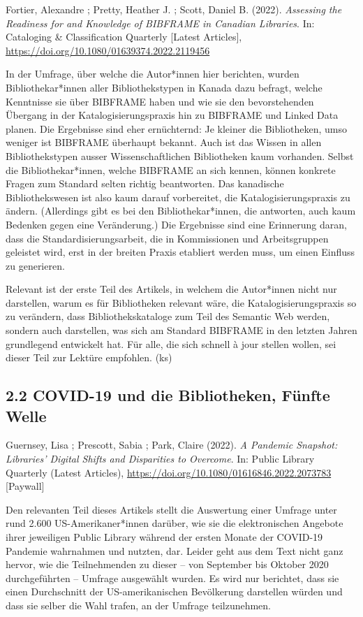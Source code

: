 \documentclass[a4paper,
fontsize=11pt,
oneside,
numbers=noperiodatend,
parskip=half-,
bibliography=totoc,
final
]{scrartcl}
\begin{document}
Fortier, Alexandre ; Pretty, Heather J. ; Scott, Daniel B. (2022).
\emph{Assessing the Readiness for and Knowledge of BIBFRAME in Canadian
Libraries}. In: Cataloging \& Classification Quarterly {[}Latest
Articles{]}, \url{https://doi.org/10.1080/01639374.2022.2119456}

In der Umfrage, über welche die Autor*innen hier berichten, wurden
Bibliothekar*innen aller Bibliothekstypen in Kanada dazu befragt, welche
Kenntnisse sie über BIBFRAME haben und wie sie den bevorstehenden
Übergang in der Katalogisierungspraxis hin zu BIBFRAME und Linked Data
planen. Die Ergebnisse sind eher ernüchternd: Je kleiner die
Bibliotheken, umso weniger ist BIBFRAME überhaupt bekannt. Auch ist das
Wissen in allen Bibliothekstypen ausser Wissenschaftlichen Bibliotheken
kaum vorhanden. Selbst die Bibliothekar*innen, welche BIBFRAME an sich
kennen, können konkrete Fragen zum Standard selten richtig beantworten.
Das kanadische Bibliothekswesen ist also kaum darauf vorbereitet, die
Katalogisierungspraxis zu ändern. (Allerdings gibt es bei den
Bibliothekar*innen, die antworten, auch kaum Bedenken gegen eine
Veränderung.) Die Ergebnisse sind eine Erinnerung daran, dass die
Standardisierungsarbeit, die in Kommissionen und Arbeitsgruppen
geleistet wird, erst in der breiten Praxis etabliert werden muss, um
einen Einfluss zu generieren.

Relevant ist der erste Teil des Artikels, in welchem die Autor*innen
nicht nur darstellen, warum es für Bibliotheken relevant wäre, die
Katalogisierungspraxis so zu verändern, dass Bibliothekskataloge zum
Teil des Semantic Web werden, sondern auch darstellen, was sich am
Standard BIBFRAME in den letzten Jahren grundlegend entwickelt hat. Für
alle, die sich schnell à jour stellen wollen, sei dieser Teil zur
Lektüre empfohlen. (ks)

\hypertarget{covid-19-und-die-bibliotheken-fuenfte-welle}{%
\subsection{2.2 COVID-19 und die Bibliotheken, Fünfte
Welle}\label{covid-19-und-die-bibliotheken-fuenfte-welle}}

Guernsey, Lisa ; Prescott, Sabia ; Park, Claire (2022). \emph{A Pandemic
Snapshot: Libraries' Digital Shifts and Disparities to Overcome}. In:
Public Library Quarterly (Latest Articles),
\url{https://doi.org/10.1080/01616846.2022.2073783} {[}Paywall{]}

Den relevanten Teil dieses Artikels stellt die Auswertung einer Umfrage
unter rund 2.600 US-Amerikaner*innen darüber, wie sie die elektronischen
Angebote ihrer jeweiligen Public Library während der ersten Monate der
COVID-19 Pandemie wahrnahmen und nutzten, dar. Leider geht aus dem Text
nicht ganz hervor, wie die Teilnehmenden zu dieser -- von September bis
Oktober 2020 durchgeführten -- Umfrage ausgewählt wurden. Es wird nur
berichtet, dass sie einen Durchschnitt der US-amerikanischen Bevölkerung
darstellen würden und dass sie selber die Wahl trafen, an der Umfrage
teilzunehmen.
\end{document}
